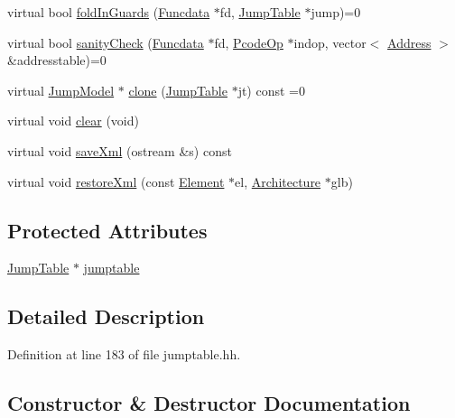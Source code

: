 \begin{DoxyCompactItemize}
virtual bool \mbox{\hyperlink{class_jump_model_a6f40ba77ddc8f4cf40f6071248103d9c}{fold\+In\+Guards}} (\mbox{\hyperlink{class_funcdata}{Funcdata}} $\ast$fd, \mbox{\hyperlink{class_jump_table}{Jump\+Table}} $\ast$jump)=0
\item 
virtual bool \mbox{\hyperlink{class_jump_model_a76a52bf3311e9d97a61d1117f6de1b0a}{sanity\+Check}} (\mbox{\hyperlink{class_funcdata}{Funcdata}} $\ast$fd, \mbox{\hyperlink{class_pcode_op}{Pcode\+Op}} $\ast$indop, vector$<$ \mbox{\hyperlink{class_address}{Address}} $>$ \&addresstable)=0
\item 
virtual \mbox{\hyperlink{class_jump_model}{Jump\+Model}} $\ast$ \mbox{\hyperlink{class_jump_model_af4eef0f1c319eb049c518631a0321ddd}{clone}} (\mbox{\hyperlink{class_jump_table}{Jump\+Table}} $\ast$jt) const =0
\item 
virtual void \mbox{\hyperlink{class_jump_model_ab733e55fd77fcbafb94269b0dc0f8088}{clear}} (void)
\item 
virtual void \mbox{\hyperlink{class_jump_model_a014148fe25655a7399bce14af4ae1ed8}{save\+Xml}} (ostream \&s) const
\item 
virtual void \mbox{\hyperlink{class_jump_model_ac0acbb92da0d5b490271a5a87f54dd00}{restore\+Xml}} (const \mbox{\hyperlink{class_element}{Element}} $\ast$el, \mbox{\hyperlink{class_architecture}{Architecture}} $\ast$glb)
\end{DoxyCompactItemize}
\subsection*{Protected Attributes}
\begin{DoxyCompactItemize}
\item 
\mbox{\hyperlink{class_jump_table}{Jump\+Table}} $\ast$ \mbox{\hyperlink{class_jump_model_a3254101eed73a4e245587679682b510d}{jumptable}}
\end{DoxyCompactItemize}


\subsection{Detailed Description}


Definition at line 183 of file jumptable.\+hh.



\subsection{Constructor \& Destructor Documentation}
\mbox{\label{class_jump_model_a06597a23cf38ace8d12285c958f1de06}} 
